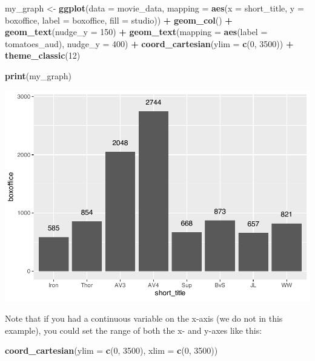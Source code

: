 \documentclass[
]{krantz}
\makeatletter
\newenvironment{Shaded}{\begin{snugshade}}{\end{snugshade}}
\newcommand{\DataTypeTok}[1]{\textcolor[rgb]{0.27,0.27,0.27}{#1}}
\newcommand{\DecValTok}[1]{\textcolor[rgb]{0.06,0.06,0.06}{#1}}
\newcommand{\KeywordTok}[1]{\textcolor[rgb]{0.27,0.27,0.27}{\textbf{#1}}}
\newcommand{\NormalTok}[1]{#1}
\newcommand{\OperatorTok}[1]{\textcolor[rgb]{0.43,0.43,0.43}{\textbf{#1}}}
\newcommand{\StringTok}[1]{\textcolor[rgb]{0.5,0.5,0.5}{#1}}
\newenvironment{kframe}{%
\medskip{}
\setlength{\fboxsep}{.8em}
 \def\at@end@of@kframe{}%
 \ifinner\ifhmode%
  \def\at@end@of@kframe{\end{minipage}}%
  \begin{minipage}{\columnwidth}%
 \fi\fi%
 \def\FrameCommand##1{\hskip\@totalleftmargin \hskip-\fboxsep
 \colorbox{shadecolor}{##1}\hskip-\fboxsep
     \hskip-\linewidth \hskip-\@totalleftmargin \hskip\columnwidth}%
 \MakeFramed {\advance\hsize-\width
   \@totalleftmargin\z@ \linewidth\hsize
   \@setminipage}}%
 {\par\unskip\endMakeFramed%
 \at@end@of@kframe}
\renewenvironment{Shaded}{\begin{kframe}}{\end{kframe}}
\makeatother
\begin{document}
\begin{Shaded}
\begin{Highlighting}[]
\NormalTok{my_graph <-}\StringTok{ }\KeywordTok{ggplot}\NormalTok{(}\DataTypeTok{data =}\NormalTok{ movie_data,}
           \DataTypeTok{mapping =} \KeywordTok{aes}\NormalTok{(}\DataTypeTok{x =}\NormalTok{ short_title,}
                         \DataTypeTok{y =}\NormalTok{ boxoffice,}
                         \DataTypeTok{label =}\NormalTok{ boxoffice, }
                         \DataTypeTok{fill =}\NormalTok{ studio)) }\OperatorTok{+}
\StringTok{  }\KeywordTok{geom_col}\NormalTok{() }\OperatorTok{+}
\StringTok{  }\KeywordTok{geom_text}\NormalTok{(}\DataTypeTok{nudge_y =} \DecValTok{150}\NormalTok{)  }\OperatorTok{+}
\StringTok{  }\KeywordTok{geom_text}\NormalTok{(}\DataTypeTok{mapping =} \KeywordTok{aes}\NormalTok{(}\DataTypeTok{label =}\NormalTok{ tomatoes_aud), }
            \DataTypeTok{nudge_y =} \DecValTok{400}\NormalTok{) }\OperatorTok{+}
\StringTok{  }\KeywordTok{coord_cartesian}\NormalTok{(}\DataTypeTok{ylim =} \KeywordTok{c}\NormalTok{(}\DecValTok{0}\NormalTok{, }\DecValTok{3500}\NormalTok{)) }\OperatorTok{+}
\StringTok{  }\KeywordTok{theme_classic}\NormalTok{(}\DecValTok{12}\NormalTok{)}


\KeywordTok{print}\NormalTok{(my_graph)}
\end{Highlighting}
\end{Shaded}

\includegraphics[width=0.65\linewidth]{bookdown_files/figure-latex/unnamed-chunk-116-1}

Note that if you had a continuous variable on the x-axis (we do not in this example), you could set the range of both the x- and y-axes like this:

\begin{Shaded}
\begin{Highlighting}[]
\KeywordTok{coord_cartesian}\NormalTok{(}\DataTypeTok{ylim =} \KeywordTok{c}\NormalTok{(}\DecValTok{0}\NormalTok{, }\DecValTok{3500}\NormalTok{),}
                \DataTypeTok{xlim =} \KeywordTok{c}\NormalTok{(}\DecValTok{0}\NormalTok{, }\DecValTok{3500}\NormalTok{))}
\end{Highlighting}
\end{Shaded}
\end{document}
